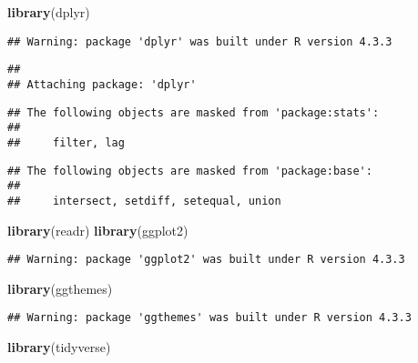 \documentclass[preprint, 3p,
authoryear]{elsarticle} %
\newenvironment{Shaded}{\begin{snugshade}}{\end{snugshade}}
\newcommand{\FunctionTok}[1]{\textcolor[rgb]{0.13,0.29,0.53}{\textbf{#1}}}
\newcommand{\NormalTok}[1]{#1}
\begin{document}
\begin{Shaded}
\begin{Highlighting}[]
\FunctionTok{library}\NormalTok{(dplyr)}
\end{Highlighting}
\end{Shaded}

\begin{verbatim}
## Warning: package 'dplyr' was built under R version 4.3.3
\end{verbatim}

\begin{verbatim}
## 
## Attaching package: 'dplyr'
\end{verbatim}

\begin{verbatim}
## The following objects are masked from 'package:stats':
## 
##     filter, lag
\end{verbatim}

\begin{verbatim}
## The following objects are masked from 'package:base':
## 
##     intersect, setdiff, setequal, union
\end{verbatim}

\begin{Shaded}
\begin{Highlighting}[]
\FunctionTok{library}\NormalTok{(readr)}
\FunctionTok{library}\NormalTok{(ggplot2)}
\end{Highlighting}
\end{Shaded}

\begin{verbatim}
## Warning: package 'ggplot2' was built under R version 4.3.3
\end{verbatim}

\begin{Shaded}
\begin{Highlighting}[]
\FunctionTok{library}\NormalTok{(ggthemes)}
\end{Highlighting}
\end{Shaded}

\begin{verbatim}
## Warning: package 'ggthemes' was built under R version 4.3.3
\end{verbatim}

\begin{Shaded}
\begin{Highlighting}[]
\FunctionTok{library}\NormalTok{(tidyverse)}
\end{Highlighting}
\end{Shaded}
\end{document}
